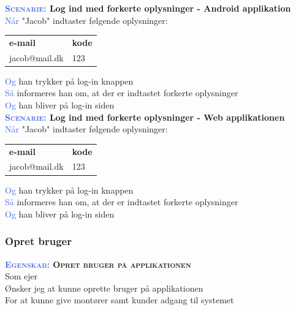 \textbf{\textsc{\textcolor{RoyalBlue}{Scenarie:}} Log ind med forkerte oplysninger - Android applikation}\\
\textcolor{RoyalBlue}{Når} "Jacob" indtaster følgende oplysninger:\\
\begin{tabular}{| l | l |}
	\textbf{e-mail} & \textbf{kode}\\
	jacob@mail.dk & 123\\
\end{tabular}
\newline \newline
\textcolor{RoyalBlue}{Og} han trykker på log-in knappen\\
\textcolor{RoyalBlue}{Så} informeres han om, at der er indtastet forkerte oplysninger\\
\textcolor{RoyalBlue}{Og} han bliver på log-in siden\\


\textbf{\textsc{\textcolor{RoyalBlue}{Scenarie:}} Log ind med forkerte oplysninger - Web applikationen}\\
\textcolor{RoyalBlue}{Når} "Jacob" indtaster følgende oplysninger:\\
\begin{tabular}{| l | l |}
	\textbf{e-mail} & \textbf{kode}\\
	jacob@mail.dk & 123\\
\end{tabular}
\newline \newline
\textcolor{RoyalBlue}{Og} han trykker på log-in knappen\\
\textcolor{RoyalBlue}{Så} informeres han om, at der er indtastet forkerte oplysninger\\
\textcolor{RoyalBlue}{Og} han bliver på log-in siden\\

\subsubsection{Opret bruger} \label{sec:USOpretBruger}
\textbf{\textsc{\textcolor{RoyalBlue}{Egenskab:} Opret bruger på applikationen}} \\
Som ejer\\
Ønsker jeg at kunne oprette bruger på applikationen\\
For at kunne give montører samt kunder adgang til systemet\\

